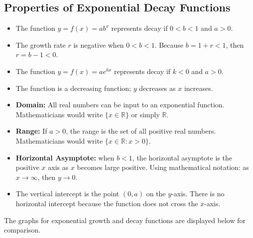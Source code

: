 \subsection{Properties of Exponential Decay Functions}
\begin{itemize}
    \item The function $y=f(x) = ab^x$ represents decay if $0 < b < 1$ and $a > 0$.
    \item The growth rate $r$ is negative when $0 < b < 1$. Because $b = 1 + r < 1$, then $r = b - 1 < 0$.
    \item The function $y=f(x) = ae^{kx}$ represents decay if $k < 0$ and $a > 0$.
    \item The function is a decreasing function; $y$ decreases as $x$ increases.
    \item \textbf{Domain:} All real numbers can be input to an exponential function. Mathematicians would write $\{x \in \mathbb{R}\}$ or simply $\mathbb{R}$.
    \item \textbf{Range:} If $a>0$, the range is the set of all positive real numbers. Mathematicians would write $\{x \in \mathbb{R}: x>0\}$.
    \item \textbf{Horizontal Asymptote:} when $b < 1$, the horizontal asymptote is the positive $x$ axis as $x$ becomes large positive. Using mathematical notation: as $x \to \infty$, then $y \to 0$.
    \item The vertical intercept is the point $(0,a)$ on the $y$-axis. There is no horizontal intercept because the function does not cross the $x$-axis.
\end{itemize}

The graphs for exponential growth and decay functions are displayed below for comparison.











